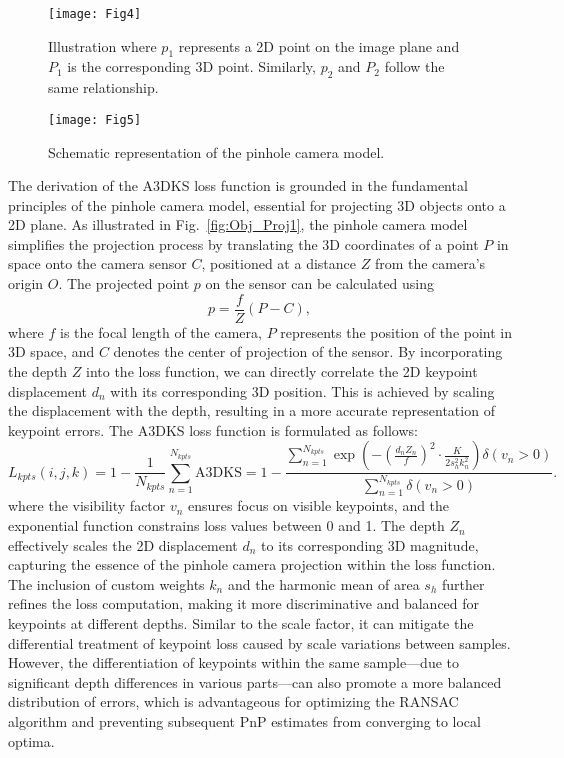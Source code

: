 \documentclass[a4paper,fleqn]{cas-sc}
\begin{document}
\begin{figure}[!htbp]
	\centering
	\texttt{[image: Fig4]} 
	\caption{Illustration where $p_1$ represents a 2D point on the image plane and $P_1$ is the corresponding 3D point. Similarly, $p_2$ and $P_2$ follow the same relationship.}
	\label{fig:A3DKS_illustration}
\end{figure}

\begin{figure}[!htbp]
	\centering
	\texttt{[image: Fig5]}
	\caption{Schematic representation of the pinhole camera model.}
	\label{fig:pinhole}
\end{figure}

The derivation of the A3DKS loss function is grounded in the fundamental principles of the pinhole camera model, essential for projecting 3D objects onto a 2D plane. As illustrated in Fig.~\ref{fig:Obj_Proj1}, the pinhole camera model simplifies the projection process by translating the 3D coordinates of a point $P$ in space onto the camera sensor $C$, positioned at a distance $Z$ from the camera's origin $O$. The projected point $p$ on the sensor can be calculated using
\begin{equation}
p = \frac{f}{Z}(P - C),
\end{equation}
where $f$ is the focal length of the camera, $P$ represents the position of the point in 3D space, and $C$ denotes the center of projection of the sensor. By incorporating the depth $Z$ into the loss function, we can directly correlate the 2D keypoint displacement $d_n$ with its corresponding 3D position. This is achieved by scaling the displacement with the depth, resulting in a more accurate representation of keypoint errors.
The A3DKS loss function is formulated as follows:
\begin{equation}
	L_{kpts}(i, j, k) 
    = 1 - \frac{1}{N_{kpts}} \sum\limits_{n=1}^{N_{kpts}} \mathrm{A3DKS}
    = 1 - \frac{\sum\limits_{n=1}^{N_{kpts}} \exp \left( -\left( \frac{d_n Z_n}{f} \right)^2 \cdot \frac{K}{2 s_h^2 k_n^2} \right) \delta(v_n > 0)}{\sum\limits_{n=1}^{N_{kpts}} \delta(v_n > 0)}.
\end{equation}
where the visibility factor $v_n$ ensures focus on visible keypoints, and the exponential function constrains loss values between 0 and 1. The depth $Z_n$ effectively scales the 2D displacement $d_n$ to its corresponding 3D magnitude, capturing the essence of the pinhole camera projection within the loss function. The inclusion of custom weights $k_n$ and the harmonic mean of area $s_h$ further refines the loss computation, making it more discriminative and balanced for keypoints at different depths. Similar to the scale factor, it can mitigate the differential treatment of keypoint loss caused by scale variations between samples. However, the differentiation of keypoints within the same sample—due to significant depth differences in various parts—can also promote a more balanced distribution of errors, which is advantageous for optimizing the RANSAC algorithm and preventing subsequent PnP estimates from converging to local optima.
\end{document}
